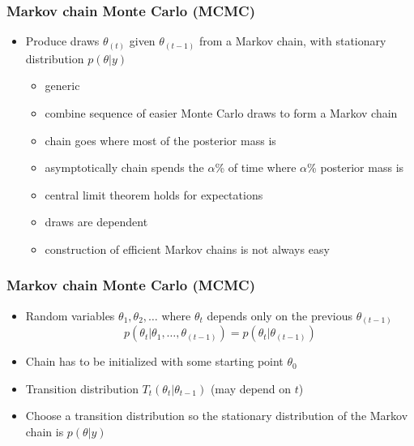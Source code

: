 \documentclass[10pt]{beamer}
\begin{document}
\begin{frame}

\frametitle{Markov chain Monte Carlo (MCMC)}

  \begin{itemize}
  \item Produce draws $\theta_{(t)}$ given $\theta_{(t-1)}$ from a
    Markov chain, with {\color{uured}stationary distribution} $p(\theta|y)$
    \begin{itemize}
    \item<2->[+] generic
    \item<2->[+] combine sequence of easier Monte Carlo draws to form a Markov chain
    \item<3->[+] chain goes where most of the posterior mass is
    \item<3->[+] asymptotically chain spends the $\alpha$\% of time where
      $\alpha$\% posterior mass is
    \item<4->[+] central limit theorem holds for expectations
    \item<5->[-] draws are dependent
    \item<5->[-] construction of efficient Markov chains is not always
      easy
    \end{itemize}
\end{itemize}

\end{frame}

\begin{frame}

\frametitle{Markov chain Monte Carlo (MCMC)}

  \begin{itemize}
  \item Random variables $\theta_1,\theta_2,\ldots$ where $\theta_t$ depends only on the previous $\theta_{(t-1)}$
    \begin{equation*}
      p(\theta_t|\theta_1,\ldots,\theta_{(t-1)})=p(\theta_t|\theta_{(t-1)})
    \end{equation*}
    \pause
  \item Chain has to be initialized with some starting point $\theta_0$ \pause
  \item Transition distribution $T_t(\theta_t|\theta_{t-1})$ (may
    depend on $t$) \pause
  \item Choose a transition distribution so the
    {\color{uured}stationary distribution} of the Markov chain is $p(\theta|y)$
  \end{itemize}

\end{frame}
\end{document}
